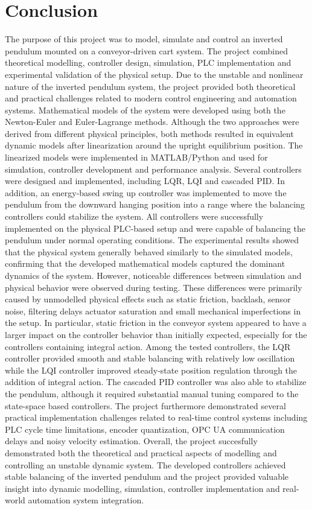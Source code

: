 \chapter{Conclusion}
\label{chap:conclusion}
The purpose of this project was to model, simulate and control an inverted pendulum mounted on a conveyor-driven cart system. The project combined theoretical modelling, controller design, simulation, PLC implementation and experimental validation of the physical setup. Due to the unstable and nonlinear nature of the inverted pendulum system, the project provided both theoretical and practical challenges related to modern control engineering and automation systems.
Mathematical models of the system were developed using both the Newton-Euler and Euler-Lagrange methods. Although the two approaches were derived from different physical principles, both methods resulted in equivalent dynamic models after linearization around the upright equilibrium position. The linearized models were implemented in MATLAB/Python and used for simulation, controller development and performance analysis.
Several controllers were designed and implemented, including LQR, LQI and cascaded PID. In addition, an energy-based swing up controller was implemented to move the pendulum from the downward hanging position into a range where the balancing controllers could stabilize the system. All controllers were successfully implemented on the physical PLC-based setup and were capable of balancing the pendulum under normal operating conditions.
The experimental results showed that the physical system generally behaved similarly to the simulated models, confirming that the developed mathematical models captured the dominant dynamics of the system. However, noticeable differences between simulation and physical behavior were observed during testing. These differences were primarily caused by unmodelled physical effects such as static friction, backlash, sensor noise, filtering delays actuator saturation and small mechanical imperfections in the setup. In particular, static friction in the conveyor system appeared to have a larger impact on the controller behavior than initially expected, especially for the controllers containing integral action.
Among the tested controllers, the LQR controller provided smooth and stable balancing with relatively low oscillation while the LQI controller improved steady-state position regulation through the addition of integral action. The cascaded PID controller was also able to stabilize the pendulum, although it required substantial manual tuning compared to the state-space based controllers. The project furthermore demonstrated several practical implementation challenges related to real-time control systems including PLC cycle time limitations, encoder quantization, OPC UA communication delays and noisy velocity estimation.
Overall, the project succesfully demonstrated both the theoretical and practical aspects of modelling and controlling an unstable dynamic system. The developed controllers achieved stable balancing of the inverted pendulum and the project provided valuable insight into dynamic modelling, simulation, controller implementation and real-world automation system integration.